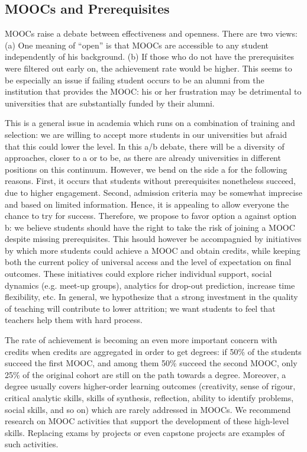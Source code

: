 \subsection{MOOCs and Prerequisites}

MOOCs raise a debate between effectiveness and openness. There are two
views: (a) One meaning of  ``open''  is that MOOCs are accessible to any
student independently of his background. (b) If those who do not have the prerequisites were filtered
out early on, the achievement rate would be higher. This seems to be especially
an issue if failing student occurs to be an alumni from the institution that provides the
MOOC: his or her frustration may be detrimental to
universities that are substantially funded by their alumni.

This is a general issue in academia which runs on a combination of training and selection: we are willing to
accept more students in our universities but afraid that this could lower the level.
In this a/b debate, there will be a diversity of approaches, closer to a or to be, 
as there are already universities in different positions on this continuum. However,
we bend on the side a for the following reasons. 
First, it occurs that students without prerequisites nonetheless succeed, due to higher
engagement. Second,  admission criteria may be somewhat
imprecise and based on limited information. Hence, it is appealing to allow
everyone the chance to try for success. Therefore, we propose to favor option a against option b: 
we believe students should have the right to take the risk of joining a MOOC despite missing
prerequisites. This hsould however be accompagnied by initiatives by which more students
could achieve a MOOC and obtain credits, while keeping both the current
policy of universal access and the level of expectation on final outcomes. 
These initiatives could explore richer
individual support, social dynamics (e.g. meet-up groups), analytics for
drop-out prediction, increase time flexibility, etc. In general, we
hypothesize that a strong investment in the quality of teaching will
contribute to lower attrition; we want students to feel that teachers
help them with hard process.

The rate of achievement is becoming an even more important concern with
credits when credits are  aggregated in order to get degrees:
if 50\% of the students succeed the first MOOC, and among them 50\%
succeed the second MOOC, only 25\% of the original cohort are still on
the path towards a degree. Moreover, a degree usually covers
higher-order learning outcomes (creativity, sense of rigour, critical
analytic skills, skills of synthesis, reflection, ability to identify
problems, social skills, and so on) which are rarely addressed in MOOCs. We
recommend research on MOOC activities that support the development of
these high-level skills. Replacing exams by projects or even capstone
projects are examples of such activities.


